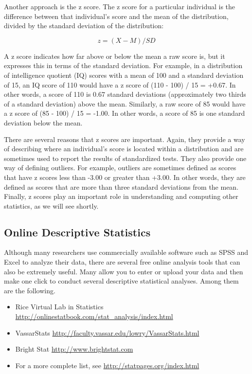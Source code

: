 Another approach is the z score. The z score for a particular individual is the difference between that individual's score and the mean of the distribution, divided by the standard deviation of the distribution:


\begin{equation}
z = (X-M)/SD
\end{equation}

A z score indicates how far above or below the mean a raw score is, but it expresses this in terms of the standard
deviation. For example, in a distribution of intelligence quotient (IQ) scores with a mean of 100 and a standard deviation of 15, an IQ score of 110 would have a z score of (110 - 100) / 15 = +0.67. In other words, a score of 110 is 0.67 standard deviations (approximately two thirds of a standard deviation) above the mean. Similarly, a raw score of 85 would have a z score of (85 - 100) / 15 = -1.00. In other words, a score of 85 is one standard deviation below the mean.


There are several reasons that z scores are important. Again, they provide a way of describing where an individual's score is located within a distribution and are sometimes used to report the results of standardized tests. They also provide one way of defining outliers. For example, outliers are sometimes defined as scores that have z scores less than -3.00 or greater than +3.00. In other words, they are defined as scores that are more than three standard deviations from the mean. Finally, z scores play an important role in understanding and computing other statistics, as we will see shortly.



\subsection{Online Descriptive Statistics}

Although many researchers use commercially available software such as SPSS and Excel to analyze their data, there are several free online analysis tools that can also be extremely useful. Many allow you to enter or upload your data and then make one click to conduct several descriptive statistical analyses. Among them are the following.

\begin{itemize}
\item Rice Virtual Lab in Statistics
\url{http://onlinestatbook.com/stat_analysis/index.html}

\item VassarStats
\url{http://faculty.vassar.edu/lowry/VassarStats.html}

\item Bright Stat
\url{http://www.brightstat.com}

\item For a more complete list, see \url{http://statpages.org/index.html}
\end{itemize}

